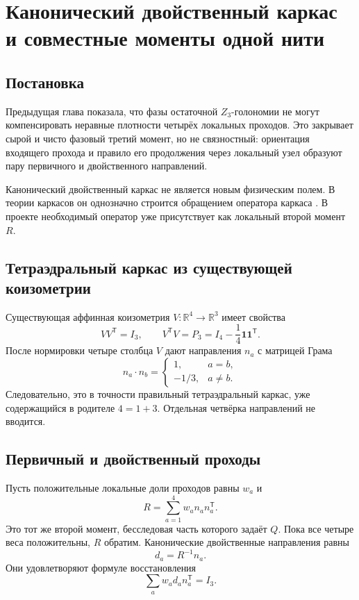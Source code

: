 \chapter{Канонический двойственный каркас и совместные моменты одной нити}
\label{ch:v6-single-thread-connectivity-weighted-moment-parent-gate}

\section{Постановка}

Предыдущая глава показала, что фазы остаточной $Z_3$-голономии не могут
компенсировать неравные плотности четырёх локальных проходов. Это закрывает
сырой и чисто фазовый третий момент, но не связностный: ориентация входящего
прохода и правило его продолжения через локальный узел образуют пару
первичного и двойственного направлений.

Канонический двойственный каркас не является новым физическим полем. В
теории каркасов он однозначно строится обращением оператора каркаса
\cite{single-thread-duffin-schaeffer1952}. В проекте необходимый оператор
уже присутствует как локальный второй момент $R$.

\section{Тетраэдральный каркас из существующей коизометрии}

Существующая аффинная коизометрия $V:\mathbb R^4\to\mathbb R^3$ имеет
свойства
\begin{equation}
 VV^{\mathsf T}=I_3,
 \qquad
 V^{\mathsf T}V=P_3=I_4-\frac14\mathbf1\mathbf1^{\mathsf T}.
\end{equation}
После нормировки четыре столбца $V$ дают направления $n_a$ с матрицей
Грама
\begin{equation}
 n_a\cdot n_b=
 \begin{cases}
 1,&a=b,\\
 -1/3,&a\ne b.
 \end{cases}
\end{equation}
Следовательно, это в точности правильный тетраэдральный каркас, уже
содержащийся в родителе $4=1+3$. Отдельная четвёрка направлений не вводится.

\section{Первичный и двойственный проходы}

Пусть положительные локальные доли проходов равны $w_a$ и
\begin{equation}
 R=\sum_{a=1}^{4}w_a n_an_a^{\mathsf T}.
\end{equation}
Это тот же второй момент, бесследовая часть которого задаёт $Q$. Пока все
четыре веса положительны, $R$ обратим. Канонические двойственные направления
равны
\begin{equation}
 d_a=R^{-1}n_a.
\end{equation}
Они удовлетворяют формуле восстановления
\begin{equation}
 \sum_aw_a d_an_a^{\mathsf T}=I_3.
\end{equation}


